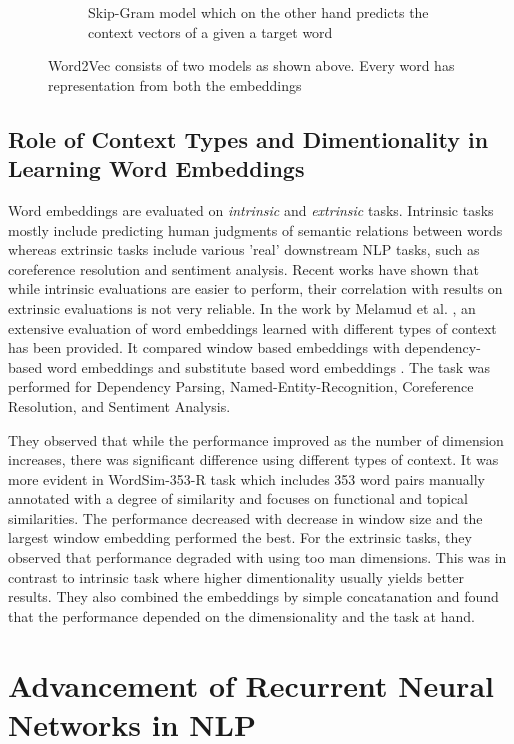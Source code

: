 \documentclass{article}
\begin{document}
\begin{figure}
\begin{subfigure}{0.4\textwidth}
			\caption{Skip-Gram model which on the other hand predicts the context vectors of a given a target word}
		\end{subfigure}
		\caption{Word2Vec consists of two models as shown above. Every word has representation from both the embeddings}
		\label{fig:w2v}
	\end{figure}

\subsection{Role of Context Types and Dimentionality in Learning Word Embeddings}
\label{sec:embdim}

	Word embeddings are evaluated on \textit{intrinsic} and \textit{extrinsic} tasks. Intrinsic tasks mostly include predicting human judgments of semantic relations between words whereas extrinsic tasks include various 'real' downstream NLP tasks, such as coreference resolution and sentiment analysis. Recent works have shown that while intrinsic evaluations are easier to perform, their correlation with results on extrinsic evaluations is not very reliable. In the work by Melamud et al. \cite{melamud}, an extensive evaluation of word embeddings learned with different types of context has been provided. It compared window based embeddings with dependency-based word embeddings \cite{dep} and substitute based word embeddings \cite{subs}. The task was performed for Dependency Parsing, Named-Entity-Recognition, Coreference Resolution, and Sentiment Analysis. 
	
	They observed that while the performance improved as the number of dimension increases, there was significant difference using different types of context. It was more evident in WordSim-353-R task \cite{finkel} which includes 353 word pairs manually annotated with a degree of similarity and focuses on functional and topical similarities. The performance decreased with decrease in window size and the largest window embedding performed the best. For the extrinsic tasks, they observed that performance degraded with using too man dimensions. This was in contrast to intrinsic task where higher dimentionality usually yields better results. They also combined the embeddings by simple concatanation and found that the performance depended on the dimensionality and the task at hand. 

\section{Advancement of Recurrent Neural Networks in NLP}
\label{sec:seqnlp}
\end{document}
